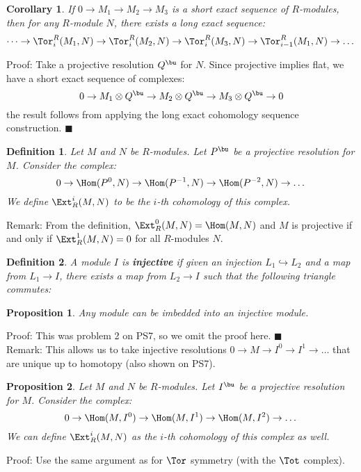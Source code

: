 \documentclass[10 pt]{article}
\newtheorem{cor}{Corollary}[section]
\newtheorem{prop}{Proposition}[section]
\newtheorem{defn}{Definition}[section]
\newcommand\bdefn{\begin{defn}}
\newcommand\bprop{\begin{prop}}
\newcommand\bcor{\begin{cor}}
\newcommand\edefn{\end{defn}}
\newcommand\ecor{\end{cor}}
\newcommand\eprop{\end{prop}}
\begin{document}
\bcor If $0\rightarrow M_1\rightarrow M_2\rightarrow M_3$ is a short exact sequence of $R$-modules, then for any $R$-module $N$, there exists a long exact sequence:
$$\dots\rightarrow \Tor_i^R(M_1,N)\rightarrow \Tor_i^R(M_2,N)\rightarrow \Tor_i^R(M_3,N)\rightarrow \Tor_{i-1}^R(M_1,N)\rightarrow\dots$$

\ecor

Proof: Take a projective resolution $Q^\bu$ for $N$.  Since projective implies flat, we have a short exact sequence of complexes:
$$0\rightarrow M_1\otimes Q^\bu\rightarrow M_2\otimes Q^\bu\rightarrow M_3\otimes Q^\bu\rightarrow 0$$
the result follows from applying the long exact cohomology sequence construction. $\blacksquare$

\bdefn Let $M$ and $N$ be $R$-modules.  Let $P^\bu$ be a projective resolution for $M$.  Consider the complex:
$$0\rightarrow \Hom(P^0,N)\rightarrow \Hom(P^{-1},N)\rightarrow \Hom(P^{-2},N)\rightarrow \dots$$
We define $\Ext^i_R(M,N)$ to be the $i$-th cohomology of this complex.
\edefn

Remark:  From the definition, $\Ext_R^0(M,N)=\Hom(M,N)$ and $M$ is projective if and only if $\Ext_R^1(M,N)=0$ for all $R$-modules $N$.

\bdefn A module $I$ is {\bf injective} if given an injection $L_1\hookrightarrow L_2$ and a map from $L_1\rightarrow I$, there exists a map from $L_2\rightarrow I$ such that the following triangle commutes:\\

\edefn

\bprop Any module can be imbedded into an injective module. \eprop

Proof:  This was problem 2 on PS7, so we omit the proof here. $\blacksquare$\\

Remark:  This allows us to take injective resolutions $0\rightarrow M\rightarrow I^0\rightarrow I^1\rightarrow\dots$ that are unique up to homotopy (also shown on PS7).\\

\bprop Let $M$ and $N$ be $R$-modules.  Let $I^\bu$ be a projective resolution for $M$.  Consider the complex:
$$0\rightarrow \Hom(M,I^0)\rightarrow \Hom(M,I^1)\rightarrow \Hom(M,I^2)\rightarrow \dots$$
We can define $\Ext^i_R(M,N)$ as the $i$-th cohomology of this complex as well.\eprop

Proof:  Use the same argument as for $\Tor$ symmetry (with the $\Tot$ complex).
\end{document}
